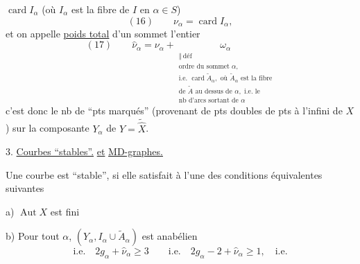 $\operatorname{card}I_\alpha$ (où $I_\alpha$ est la fibre de $I$ en $\alpha\in S$)
\[
(16)\qquad\nu_\alpha=\operatorname{card}I_\alpha,
\]
et on appelle \uline{poids total} d'un sommet l'entier
\[
(17)\qquad\widehat\nu_\alpha=\nu_\alpha+
\underset{\substack{\Vert\ \mathrm{déf}\\
\text{ordre du sommet }\alpha,\\
\text{i.e. }\operatorname{card}\widetilde A_\alpha,\text{ où }\widetilde A_\alpha\text{ est la fibre}\\
\text{de }\widetilde A\text{ au dessus de }\alpha,\text{ i.e. le}\\
\text{nb d'arcs sortant de }\alpha}}{\omega_\alpha}
\]
c'est donc le nb de ``pts marqués'' (provenant de pts doubles  de pts à l'infini de $X$) sur la composante $Y_\alpha$ de $Y=\widetilde{\widehat X}$.

3. \uline{Courbes ``stables''.} \uline{et} \uline{MD-graphes.}

Une courbe   est ``stable'', si elle satisfait à l'une des conditions équivalentes suivantes

a) $\operatorname{Aut}X$ est fini

b) Pour tout $\alpha$, $(Y_\alpha,I_\alpha\cup\widetilde A_\alpha)$ est anabélien
\[
\text{i.e.}\quad 2g_\alpha+\widehat\nu_\alpha\geq3\qquad
\text{i.e.}\quad 2g_\alpha-2+\widehat\nu_\alpha\geq1,\quad\text{i.e.}
\]
